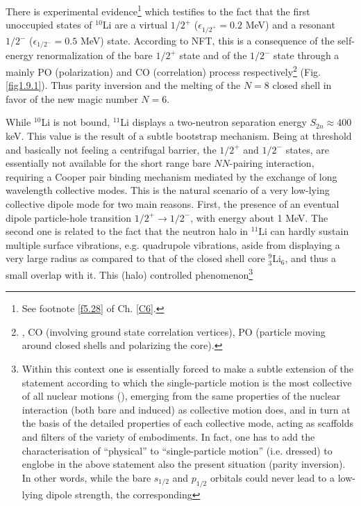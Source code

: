  
 
There is  experimental evidence\footnote{See footnote \ref{f5.28} of Ch. \ref{C6}.} which testifies to the fact that the first unoccupied states of $^{10}$Li are a virtual $1/2^+$ ($\epsilon_{1/2^+}=0.2$ MeV) and a resonant $1/2^-$ ($\epsilon_{1/2^-}=0.5$ MeV) state.   According to NFT, this is a consequence of the self-energy renormalization of the bare $1/2^+$ state and of the $1/2^-$ state through a mainly PO (polarization) and CO (correlation) process respectively\footnote{\cite{Barranco:01}, CO (involving ground state correlation vertices), PO (particle moving around closed shells and polarizing the core).} (Fig. \ref{fig1.9.1}). Thus parity inversion and the melting of  the $N=8$ closed shell in favor of the new magic number $N=6$. 


While $^{10}$Li is not bound, $^{11}$Li displays a two-neutron separation energy $S_{2n}\approx400$ keV.  This value  is the result of a subtle bootstrap mechanism. Being at threshold and basically not feeling a centrifugal barrier, the $1/2^+$ and $1/2^-$ states, are essentially not available for the short range bare $NN$-pairing interaction, requiring a Cooper pair binding mechanism mediated by  the exchange of  long wavelength collective modes. This is the natural scenario of a very low-lying collective dipole mode for two main reasons. First, the presence of an eventual dipole particle-hole transition $1/2^+\rightarrow 1/2^-$, with energy about 1 MeV. The second one is related to  the fact that the neutron halo in $^{11}$Li can hardly sustain multiple surface vibrations, e.g. quadrupole vibrations, aside from displaying a very large radius as compared to that of the closed shell core $^9_3$Li$_6$, and thus a small overlap with it. This (halo)  controlled phenomenon\footnote{Within this context one is essentially forced to make a subtle  extension of the statement according to which  the single-particle motion is the most collective  
of all nuclear motions (\cite{Mottelson:62}), emerging from  the same properties  of the nuclear interaction 
(both bare and induced) as collective motion does, 
and in turn at the basis of the detailed properties of each collective mode, acting as
 scaffolds and filters of the variety of embodiments. In fact, one 
has  to add the characterisation of ``physical'' to ``single-particle motion'' (i.e. dressed) to englobe in  the above statement 
also the present  situation (parity inversion). In other words, while the bare $s_{1/2}$ and $p_{1/2}$ orbitals could never lead to a low-lying dipole strength, the corresponding 
}
